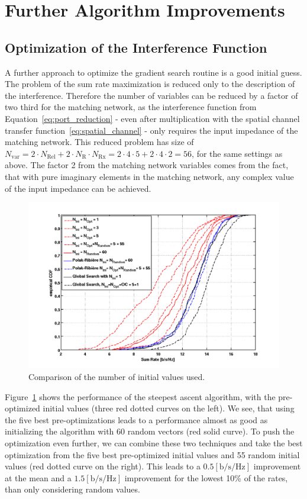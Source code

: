 \section{Further Algorithm Improvements}

\subsection{Optimization of the Interference Function}
\label{sec:preoptimization}
A further approach to optimize the gradient search routine is a good initial guess.
The problem of the sum rate maximization is reduced only to the description of the interference.
Therefore the number of variables can be reduced by a factor of two third for the matching network, as the interference function from Equation~\eqref{eq:port_reduction} - even after multiplication with the spatial channel transfer function~\eqref{eq:spatial_channel} - only requires the input impedance of the matching network.
This reduced problem has size of $N_\text{var} =  2\cdot N_\text{Rel}+2\cdot N_\text{R}\cdot N_\text{Rx} = 2\cdot 4\cdot 5 + 2\cdot 4\cdot 2 = 56$, for the same settings as above.
The factor 2 from the matching network variables comes from the fact, that with pure imaginary elements in the matching network, any complex value of the input impedance can be achieved.

\begin{figure}[hb]
\centering
  \includegraphics[width=0.7\linewidth]{images/Inioptcomparison_edited.png}
\caption{Comparison of the number of initial values used.}
\label{fig:iniopt_comp}
\end{figure}

Figure~\ref{fig:iniopt_comp} shows the performance of the steepest ascent algorithm, with the pre-optimized initial values (three red dotted curves on the left).
We see, that using the five best pre-optimizations leads to a performance almost as good as initializing the algorithm with 60 random vectors (red solid curve).
To push the optimization even further, we can combine these two techniques and take the best optimization from the five best pre-optimized initial values and 55 random initial values (red dotted curve on the right).
This leads to a $0.5 \left[\text{b/s/Hz}\right]$ improvement at the mean and a $1.5 \left[\text{b/s/Hz}\right]$ improvement for the lowest 10\% of the rates, than only considering random values.

